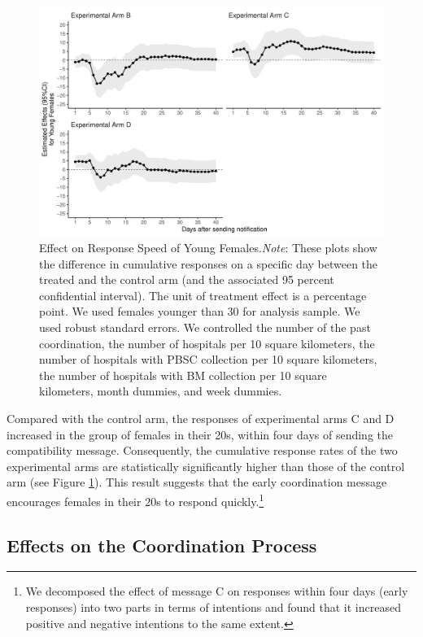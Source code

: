 \documentclass[12pt, a4paper]{article}
\begin{document}
\begin{figure}[t]
\includegraphics{JMDP RCT - Main Document_files/figure-latex/young-female-flow-1} \caption{Effect on Response Speed of Young Females.\newline \emph{Note}: These plots show the difference in cumulative responses on a specific day between the treated and the control arm (and the associated 95 percent confidential interval). The unit of treatment effect is a percentage point. We used females younger than 30 for analysis sample. We used robust standard errors. We controlled the number of the past coordination, the number of hospitals per 10 square kilometers, the number of hospitals with PBSC collection per 10 square kilometers, the number of hospitals with BM collection per 10 square kilometers, month dummies, and week dummies.}\label{fig:young-female-flow}
\end{figure}

Compared with the control arm, the responses of experimental arms C and D increased in the group of females in their 20s, within four days of sending the compatibility message. Consequently, the cumulative response rates of the two experimental arms are statistically significantly higher than those of the control arm (see Figure \ref{fig:young-female-flow}). This result suggests that the early coordination message encourages females in their 20s to respond quickly.\footnote{We decomposed the effect of message C on responses within four days (early responses) into two parts in terms of intentions and found that it increased positive and negative intentions to the same extent.}

\hypertarget{process}{%
\subsection{Effects on the Coordination Process}\label{process}}
\end{document}
